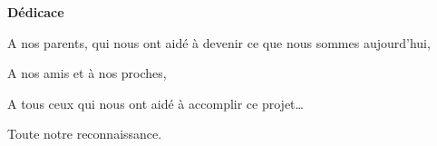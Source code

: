 \thispagestyle{empty}
\begin{center}
\LARGE\textbf{Dédicace}
\end{center}

\large
\noindent
A nos parents, qui nous ont aidé à devenir ce que nous sommes aujourd’hui,\par
\vspace{12pt}
\noindent
A nos amis et à nos proches,\par
\vspace{12pt}
\noindent
A tous ceux qui nous ont aidé à accomplir ce projet…\par
\vspace{12pt}
\noindent
Toute notre reconnaissance.

\newpage
